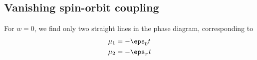 \subsection{Vanishing spin-orbit coupling}
For $w=0$, we find only two straight lines in the phase diagram, corresponding to
\begin{align}
    \mu_1 &= -\eps_0 t \\
    \mu_2 &= -\eps_\pi t
\end{align}






